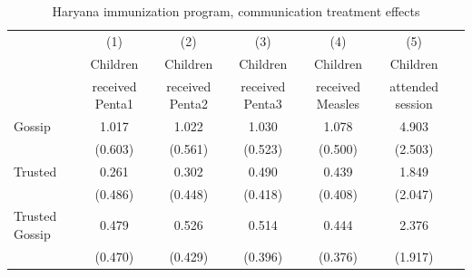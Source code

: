 \begin{table}[!h]
		\centering
		\caption{Haryana immunization program, communication treatment effects\label{tab:main_haryana}}
		\scalebox{0.8}
		{\begin{threeparttable}
		\begin{tabular}{lcccccc} \hline
	& (1) & (2) & (3) & (4) & (5) \\
	& Children & Children & Children & Children& Children \\
	  &received Penta1 &  received Penta2 &  received Penta3 &  received Measles & attended session\\ \hline    
Gossip             & 1.017 & 1.022 & 1.030 & 1.078 & 4.903        \\
 & (0.603) & (0.561) & (0.523) & (0.500) & (2.503)   \\
Trusted             & 0.261 & 0.302 & 0.490 & 0.439 & 1.849       \\
 & (0.486) & (0.448) & (0.418) & (0.408) & (2.047)  \\
Trusted Gossip     & 0.479 & 0.526 & 0.514 & 0.444 & 2.376        \\
  & (0.470) & (0.429) & (0.396) & (0.376) & (1.917)    \\


\end{tabular}
\end{threeparttable}}
\end{table}
